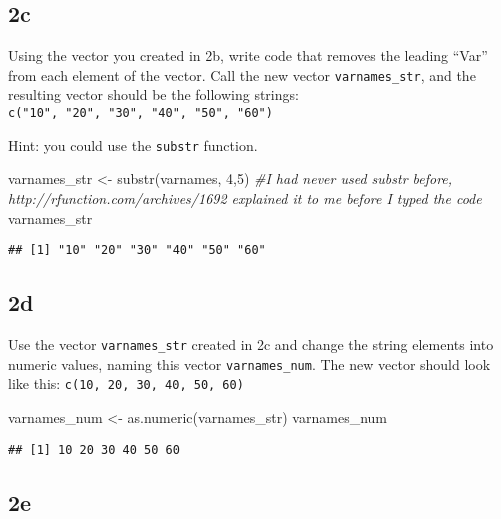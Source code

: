 \documentclass[
]{article}
\newenvironment{Shaded}{\begin{snugshade}}{\end{snugshade}}
\newcommand{\CommentTok}[1]{\textcolor[rgb]{0.56,0.35,0.01}{\textit{#1}}}
\newcommand{\DecValTok}[1]{\textcolor[rgb]{0.00,0.00,0.81}{#1}}
\newcommand{\FunctionTok}[1]{\textcolor[rgb]{0.00,0.00,0.00}{#1}}
\newcommand{\NormalTok}[1]{#1}
\newcommand{\OtherTok}[1]{\textcolor[rgb]{0.56,0.35,0.01}{#1}}
\begin{document}
\hypertarget{c-1}{%
\subsection{2c}\label{c-1}}

Using the vector you created in 2b, write code that removes the leading
``Var'' from each element of the vector. Call the new vector
\texttt{varnames\_str}, and the resulting vector should be the following
strings: \texttt{c("10",\ "20",\ "30",\ "40",\ "50",\ "60")}

Hint: you could use the \texttt{substr} function.

\begin{Shaded}
\begin{Highlighting}[]
\NormalTok{varnames\_str }\OtherTok{\textless{}{-}} \FunctionTok{substr}\NormalTok{(varnames, }\DecValTok{4}\NormalTok{,}\DecValTok{5}\NormalTok{)}
\CommentTok{\#I had never used substr before, http://rfunction.com/archives/1692 explained it to me before I typed the code}
\NormalTok{varnames\_str}
\end{Highlighting}
\end{Shaded}

\begin{verbatim}
## [1] "10" "20" "30" "40" "50" "60"
\end{verbatim}

\hypertarget{d}{%
\subsection{2d}\label{d}}

Use the vector \texttt{varnames\_str} created in 2c and change the
string elements into numeric values, naming this vector
\texttt{varnames\_num}. The new vector should look like this:
\texttt{c(10,\ 20,\ 30,\ 40,\ 50,\ 60)}

\begin{Shaded}
\begin{Highlighting}[]
\NormalTok{varnames\_num }\OtherTok{\textless{}{-}} \FunctionTok{as.numeric}\NormalTok{(varnames\_str)}
\NormalTok{varnames\_num}
\end{Highlighting}
\end{Shaded}

\begin{verbatim}
## [1] 10 20 30 40 50 60
\end{verbatim}

\hypertarget{e}{%
\subsection{2e}\label{e}}
\end{document}

